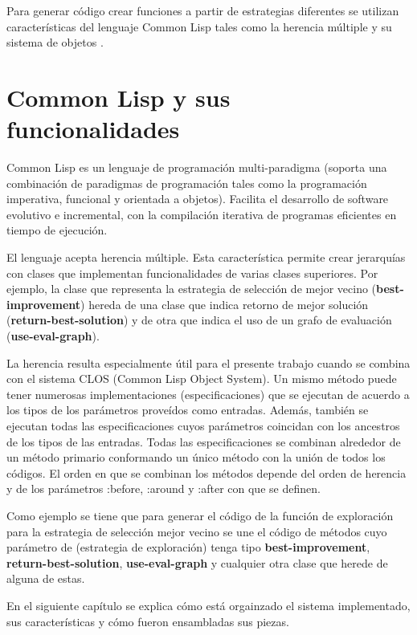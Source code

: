 Para generar código crear funciones a partir de estrategias diferentes se utilizan características del lenguaje Common Lisp \cite{TODO} tales como la herencia múltiple y su sistema de objetos \cite{TODO}.

\section{Common Lisp y sus funcionalidades}\label{2-Lisp}
Common Lisp es un lenguaje de programación multi-paradigma (soporta una combinación de paradigmas de programación tales como la programación imperativa, funcional y orientada a objetos). Facilita el desarrollo de software evolutivo e incremental, con la compilación iterativa de programas eficientes en tiempo de ejecución.

El lenguaje acepta herencia múltiple. Esta característica permite crear jerarquías con clases que implementan funcionalidades de varias clases superiores. Por ejemplo, la clase que representa la estrategia de selección de mejor vecino (\textbf{best-improvement}) hereda de una clase que indica  retorno de mejor solución (\textbf{return-best-solution}) y de otra que indica el uso de un grafo de evaluación (\textbf{use-eval-graph}).

La herencia resulta especialmente útil para el presente trabajo cuando se combina con el sistema CLOS (Common Lisp Object System). Un mismo método puede tener numerosas implementaciones (especificaciones) que se ejecutan de acuerdo a los tipos de los parámetros proveídos como entradas. Además, también se ejecutan todas las especificaciones cuyos parámetros coincidan con los ancestros de los tipos de las entradas. Todas las especificaciones se combinan alrededor de un método primario conformando un único método con la unión de todos los códigos. El orden en que se combinan los métodos depende del orden de herencia y de los parámetros :before, :around y :after con que se definen.

Como ejemplo se tiene que para generar el código de la función de exploración para la estrategia de selección mejor vecino se une el código de métodos cuyo parámetro de  (estrategia de exploración) tenga tipo \textbf{best-improvement}, \textbf{return-best-solution}, \textbf{use-eval-graph} y cualquier otra clase que herede de alguna de estas. 

En el siguiente capítulo se explica cómo está orgainzado el sistema implementado, sus características y cómo fueron ensambladas sus piezas.



























